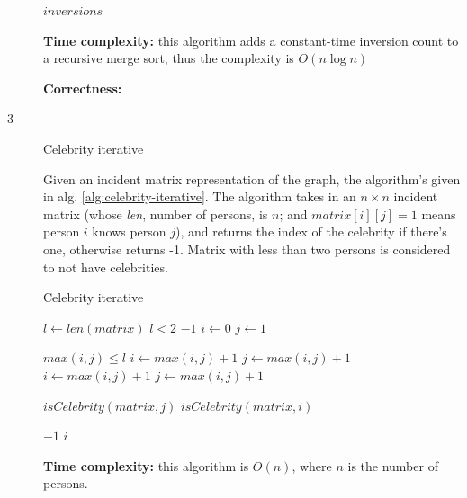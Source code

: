 \documentclass{article}
\begin{document}
\begin{description}
\begin{algorithm}[h]
\begin{algorithmic}[1]
      \State \Return $inversions$
    \EndFunction

    \end{algorithmic}
  \end{algorithm}
  
  \textbf{Time complexity:} this algorithm adds a constant-time inversion count to a recursive merge sort, thus the complexity is $O(n\log n)$

  \textbf{Correctness:} 

\item[3]{Celebrity iterative}

  Given an incident matrix representation of the graph, the algorithm's given in alg. \ref{alg:celebrity-iterative}. The algorithm takes in an $n \times n$ incident matrix (whose \textit{len}, number of persons, is $n$; and $matrix[i][j] = 1$ means person $i$ knows person $j$), and returns the index of the celebrity if there's one, otherwise returns -1. Matrix with less than two persons is considered to not have celebrities.

  \begin{algorithm}[h]
  \caption{Celebrity iterative}
  \label{alg:celebrity-iterative}
    \begin{algorithmic}[1]
      \State $l \gets len(matrix)$
      \If $l < 2$
        \Return $-1$
      \EndIf
      \State $i \gets 0$
      \State $j \gets 1$

      \While $max(i, j) \leq l$
          \State $i \gets max(i,j) + 1$
          \State $j \gets max(i,j) + 1$
        \Else
          \State $i \gets max(i,j) + 1$
          \State $j \gets max(i,j) + 1$
        \EndIf
      \EndWhile

        \State \Return $isCelebrity(matrix, j)$
      \Else
        \State \Return $isCelebrity(matrix, i)$
      \EndIf
    \EndFunction

          \State \Return $-1$
        \EndIf
      \EndFor
      \State \Return $i$
    \EndFunction
    \end{algorithmic}
  \end{algorithm}

  \textbf{Time complexity:} this algorithm is $O(n)$, where $n$ is the number of persons.


\end{description}
\end{document}
